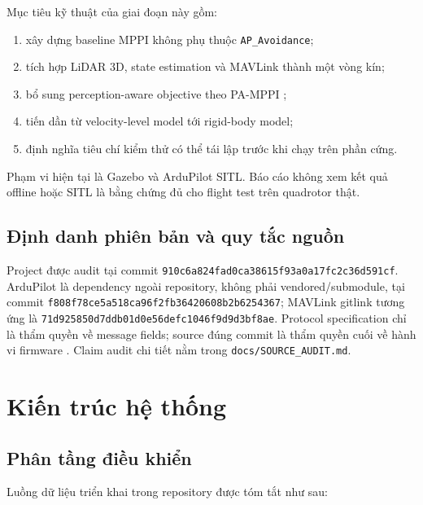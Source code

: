 \documentclass[11pt,a4paper]{article}
\newcommand{\code}[1]{\texttt{#1}}
\begin{document}
Mục tiêu kỹ thuật của giai đoạn này gồm:

\begin{enumerate}
  \item xây dựng baseline MPPI không phụ thuộc \code{AP\_Avoidance};
  \item tích hợp LiDAR 3D, state estimation và MAVLink thành một vòng kín;
  \item bổ sung perception-aware objective theo PA-MPPI \cite{zhai2026pamppi};
  \item tiến dần từ velocity-level model tới rigid-body model;
  \item định nghĩa tiêu chí kiểm thử có thể tái lập trước khi chạy trên phần cứng.
\end{enumerate}

Phạm vi hiện tại là Gazebo và ArduPilot SITL. Báo cáo không xem kết quả offline
hoặc SITL là bằng chứng đủ cho flight test trên quadrotor thật.

\subsection*{Định danh phiên bản và quy tắc nguồn}

\begingroup\small
Project được audit tại commit
\texttt{910c6a824fad0ca38615f93a0a17fc2c36d591cf}. ArduPilot là dependency ngoài
repository, không phải vendored/submodule, tại commit
\texttt{f808f78ce5a518ca96f2fb36420608b2b6254367}; MAVLink gitlink tương ứng là
\texttt{71d925850d7ddb01d0e56defc1046f9d9d3bf8ae}. Protocol specification chỉ là
thẩm quyền về message fields; source đúng commit là thẩm quyền cuối về hành vi
firmware \cite{mavlinkCommon2026,ardupilotSourceF808}. Claim audit chi tiết nằm
trong \code{docs/SOURCE\_AUDIT.md}.
\endgroup

\section{Kiến trúc hệ thống}

\subsection{Phân tầng điều khiển}

Luồng dữ liệu triển khai trong repository được tóm tắt như sau:

\begin{center}
\end{center}
\end{document}
